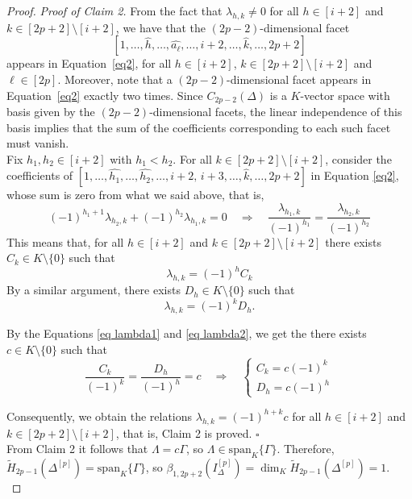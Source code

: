 \documentclass[12pt]{amsart}
\begin{document}
\begin{proof}
\textit{Proof of Claim 2.} From the fact that $\lambda_{h,k} \neq 0$ for all $h \in [i+2]$ and $k \in [2p+2]\setminus[i+2]$, we have that the $(2p-2)$-dimensional facet
\[
\left[1,\dots,\widehat{h},\dots, \widehat{a_\ell},\dots,i+2,\dots,\widehat{k},\dots,2p+2 \right]
\]
appears in Equation~\ref{eq2}, for all $h \in [i+2]$, $k \in [2p+2]\setminus[i+2]$ and $\ell \in [2p]$. Moreover, note that a $(2p-2)$-dimensional facet appears in Equation~\ref{eq2} exactly two times.
Since $C_{2p-2}(\Delta)$ is a $K$-vector space with basis given by the
$(2p-2)$-dimensional facets, the linear independence of this basis implies that
the sum of the coefficients corresponding to each such facet must vanish.\\
Fix $h_1,h_2\in [i+2]$ with $h_1<h_2$. For all $k\in [2p+2]\setminus[i+2]$, consider the coefficients of $[1,\dots,\widehat{h_1}, \dots,\widehat{h_2},\dots, i+2,\,i+3,\dots,\widehat{k},\dots,2p+2]$ in Equation \eqref{eq2}, whose sum is zero from what we said above, that is,
$$
(-1)^{h_1+1}\lambda_{h_2,k}+(-1)^{h_2}\lambda_{h_1,k}=0\quad \Rightarrow \quad\frac{\lambda_{h_1,k}}{(-1)^{h_1}}=\frac{\lambda_{h_2,k}}{(-1)^{h_2}}
$$
This means that, for all $h\in [i+2]$ and $k\in [2p+2]\setminus[i+2]$ there exists $C_k\in K\setminus\{0\}$ such that 
\begin{equation}\label{eq lambda1}
    \lambda_{h,k}=(-1)^hC_k
\end{equation}
By a similar argument, there exists $D_h\in K\setminus\{0\}$ such that \begin{equation}\label{eq lambda2}
    \lambda_{h,k}=(-1)^kD_h.
\end{equation}

By the Equations \ref{eq lambda1} and \ref{eq lambda2}, we get the there exists $c\in K\setminus\{0\}$ such that 
$$
\frac{C_k}{(-1)^k}=\frac{D_h}{(-1)^h}=c\quad \Rightarrow\quad \begin{cases}
    C_k= c (-1)^k\\
    D_h = c (-1)^h
\end{cases}
$$

Consequently, we obtain the relations $\lambda_{h,k} = (-1)^{h+k} c$ for all $h\in [i+2]$ and $k\in [2p+2]\setminus[i+2]$, that is, Claim 2 is proved. $\square$\\



From Claim 2 it follows that $\Lambda= c \Gamma$, so $\Lambda\in \mathrm{span}_K\{\Gamma\}$. Therefore, $\tilde{H}_{2p-1}(\Delta^{[p]})=\mathrm{span}_K\{\Gamma\}$, so $\beta_{1,2p+2}(I_{\Delta}^{[p]}) = \dim_K \tilde{H}_{2p-1}(\Delta^{[p]})=1.$\\



\end{proof}
\end{document}
